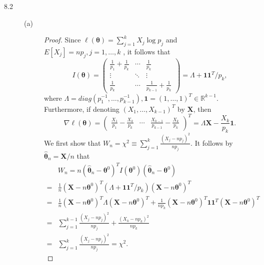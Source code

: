 \documentclass{article}
\newcommand{\real}{\mathbb{R}}
\theoremstyle{definition}
\theoremstyle{plain}
\theoremstyle{remark}
\begin{document}
\begin{description}
\item[8.2]
\begin{description}
\item[(a)]
\begin{proof}
Since $\ell(\bm{\theta}) = \sum_{j = 1}^k X_j\log p_j$ and $E[X_j] = np_j, j = 1, \ldots, k$
, it follows that 
\begin{equation*}
    I(\bm{\theta}) = \begin{pmatrix}
    \frac{1}{p_1} + \frac{1}{p_k} & \cdots & \frac{1}{p_k} \\
    \vdots & \ddots & \vdots \\
    \frac{1}{p_k} & \cdots & \frac{1}{p_{k - 1}} + \frac{1}{p_k} 
    \end{pmatrix} = 
    \Lambda + \bm{1}\bm{1}^T/p_k,
\end{equation*}
where $\Lambda = diag(p_1^{-1}, \ldots, p_{k - 1}^{-1}), \bm{1} = (1, \ldots, 1)^T \in 
\real^{k - 1}$. Furthermore, if denoting $(X_1, \ldots, X_{k - 1})^T$ by $\bm{X}$, then
\begin{equation*}
    \nabla \ell(\bm{\theta}) = \begin{pmatrix}
    \frac{X_1}{p_1} - \frac{X_k}{p_k} & \cdots & \frac{X_{k - 1}}{p_{k - 1}} - \frac{X_k}{p_k}
    \end{pmatrix}^T = \Lambda\bm{X} - \frac{X_k}{p_k}\bm{1}.
\end{equation*}
We first show that $W_n = \chi^2 \equiv \sum_{j = 1}^k \frac{(X_j - np_j)^2}{np_j}$. It 
follows by $\hat{\bm{\theta}}_n = \bm{X}/n$ that 
\begin{align*}
    & W_n = n(\hat{\bm{\theta}}_n - \bm{\theta}^0)^TI(\bm{\theta}^0)(\hat{\bm{\theta}}_n - \bm{\theta}^0) \\
    = & \frac{1}{n}(\bm{X} - n\bm{\theta}^0)^T(\Lambda + \bm{1}\bm{1}^T/p_k)(\bm{X} - 
    n\bm{\theta}^0)^T \\
    = & \frac{1}{n}(\bm{X} - n\bm{\theta}^0)^T\Lambda(\bm{X} - n\bm{\theta}^0)^T + 
    \frac{1}{np_k}(\bm{X} - n\bm{\theta}^0)^T\bm{1}\bm{1}^T(\bm{X} - n\bm{\theta}^0)^T \\
    = & \sum_{j = 1}^{k - 1}\frac{(X_j - np_j)^2}{np_j} + \frac{(X_k - np_k)^2}{np_k} \\
    = & \sum_{j = 1}^k\frac{(X_j - np_j)^2}{np_j} = \chi^2.
\end{align*}


\end{proof}
\end{description}
\end{description}
\end{document}
